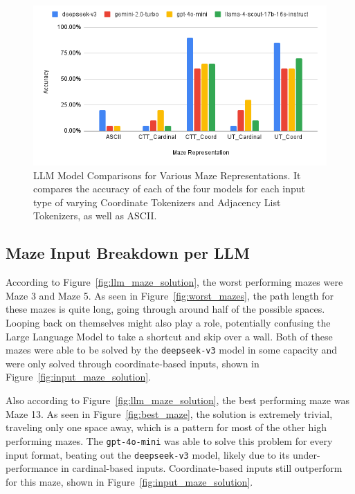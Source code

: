 \documentclass[conference]{IEEEtran}
\begin{document}
\begin{figure}[htbp]
  \centering
  \includegraphics[width=\columnwidth]{LLM Model Comparisons for Various Maze Representations.png}
  \caption{LLM Model Comparisons for Various Maze Representations. It compares the accuracy of each of the four models for each input type of varying Coordinate Tokenizers and Adjacency List Tokenizers, as well as ASCII.}
  \label{fig:llm_comp}
\end{figure}

\subsection{Maze Input Breakdown per LLM}

According to Figure~\ref{fig:llm_maze_solution}, the worst performing mazes were Maze 3 and Maze 5. As seen in Figure~\ref{fig:worst_mazes}, the path length for these mazes is quite long, going through around half of the possible spaces. Looping back on themselves might also play a role, potentially confusing the Large Language Model to take a shortcut and skip over a wall. Both of these mazes were able to be solved by the \texttt{deepseek-v3} model in some capacity and were only solved through coordinate-based inputs, shown in Figure~\ref{fig:input_maze_solution}.

Also according to Figure~\ref{fig:llm_maze_solution}, the best performing maze was Maze 13. As seen in Figure~\ref{fig:best_maze}, the solution is extremely trivial, traveling only one space away, which is a pattern for most of the other high performing mazes. The \texttt{gpt-4o-mini} was able to solve this problem for every input format, beating out the \texttt{deepseek-v3} model, likely due to its under-performance in cardinal-based inputs. Coordinate-based inputs still outperform for this maze, shown in Figure~\ref{fig:input_maze_solution}.
\end{document}
